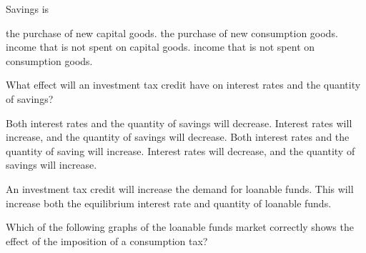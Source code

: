 \documentclass[addpoints,11pt]{exam}
\theoremstyle{definition}
\begin{document}
\begin{questions}
	\question Savings is 
	
	
	
	\begin{choices}
		\choice the purchase of new capital goods.
		\choice the purchase of new consumption goods.
		\choice income that is not spent on capital goods.
		\CorrectChoice income that is not spent on consumption goods. 
	\end{choices}	
	

\question What effect will an investment tax credit have on interest rates and the quantity of savings?

\begin{choices}
	\choice Both interest rates and the quantity of savings will decrease.
	\choice Interest rates will increase, and the quantity of savings will decrease.
	\CorrectChoice Both interest rates and the quantity of saving will increase.
	\choice Interest rates will decrease, and the quantity of savings will increase.
\end{choices}

\begin{solution}
	An investment tax credit will increase the demand for loanable funds. This will increase both the equilibrium interest rate and quantity of loanable funds.
\end{solution}

\newpage

\question Which of the following graphs of the loanable funds market correctly shows the effect of the imposition of a consumption tax?


\end{questions}
\end{document}
